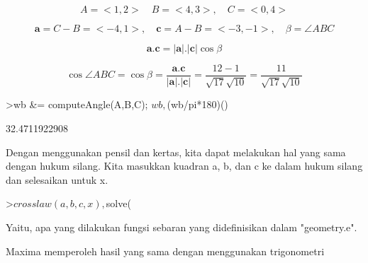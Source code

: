 \documentclass[a4paper,10pt]{article}
\begin{document}
\begin{eulernotebook}
\begin{eulercomment}
\begin{eulercomment}
\begin{eulercomment}
\begin{eulercomment}
\begin{eulercomment}
\begin{eulercomment}
\begin{eulercomment}
\begin{eulercomment}
\begin{eulercomment}
\begin{eulercomment}
\begin{eulercomment}
\begin{eulercomment}
\begin{eulercomment}
\begin{eulercomment}
\begin{eulercomment}
\begin{eulercomment}
\begin{eulercomment}
\begin{eulercomment}
\begin{eulercomment}
\begin{eulercomment}
\begin{eulercomment}
\begin{eulercomment}
\begin{eulercomment}
\begin{eulercomment}
\begin{eulercomment}
\begin{eulercomment}
\begin{eulercomment}
\begin{eulercomment}
\begin{eulercomment}
\begin{eulercomment}
\begin{eulercomment}
\end{eulercomment}
\begin{eulerformula}
\[
A=<1,2>\quad B=<4,3>,\quad C=<0,4>
\]
\end{eulerformula}
\begin{eulerformula}
\[
\mathbf{a}=C-B=<-4,1>,\quad \mathbf{c}=A-B=<-3,-1>,\quad \beta=\angle ABC
\]
\end{eulerformula}
\begin{eulerformula}
\[
\mathbf{a}.\mathbf{c}=|\mathbf{a}|.|\mathbf{c}|\cos \beta
\]
\end{eulerformula}
\begin{eulerformula}
\[
\cos \angle ABC =\cos\beta=\frac{\mathbf{a}.\mathbf{c}}{|\mathbf{a}|.|\mathbf{c}|}=\frac{12-1}{\sqrt{17}\sqrt{10}}=\frac{11}{\sqrt{17}\sqrt{10}}
\]
\end{eulerformula}
\begin{eulerprompt}
>wb &= computeAngle(A,B,C); $wb, $(wb/pi*180)()
\end{eulerprompt}
\begin{euleroutput}
  32.4711922908
\end{euleroutput}
\begin{eulercomment}
Dengan menggunakan pensil dan kertas, kita dapat melakukan hal yang
sama dengan hukum silang. Kita masukkan kuadran a, b, dan c ke dalam
hukum silang dan selesaikan untuk x.
\end{eulercomment}
\begin{eulerprompt}
>$crosslaw(a,b,c,x), $solve(%
\end{eulerprompt}
\begin{eulercomment}
Yaitu, apa yang dilakukan fungsi sebaran yang didefinisikan dalam
"geometry.e".
\end{eulercomment}
\begin{eulercomment}
Maxima memperoleh hasil yang sama dengan menggunakan trigonometri

\end{eulercomment}
\end{eulercomment}
\end{eulercomment}
\end{eulercomment}
\end{eulercomment}
\end{eulercomment}
\end{eulercomment}
\end{eulercomment}
\end{eulercomment}
\end{eulercomment}
\end{eulercomment}
\end{eulercomment}
\end{eulercomment}
\end{eulercomment}
\end{eulercomment}
\end{eulercomment}
\end{eulercomment}
\end{eulercomment}
\end{eulercomment}
\end{eulercomment}
\end{eulercomment}
\end{eulercomment}
\end{eulercomment}
\end{eulercomment}
\end{eulercomment}
\end{eulercomment}
\end{eulercomment}
\end{eulercomment}
\end{eulercomment}
\end{eulercomment}
\end{eulercomment}
\end{eulernotebook}
\end{document}
